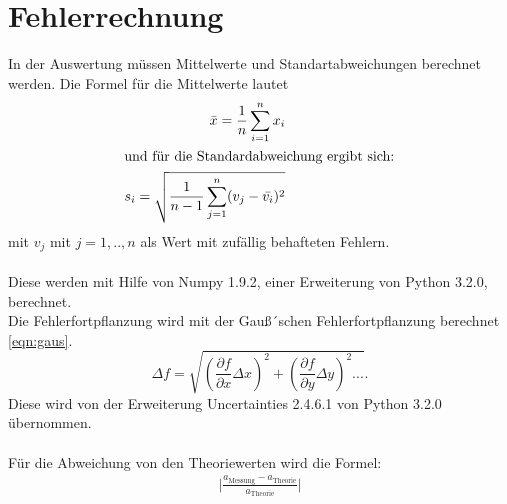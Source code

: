 \newpage
\section{Fehlerrechnung}
\label{fehlerrechnung}
In der Auswertung müssen Mittelwerte und Standartabweichungen berechnet werden.
Die Formel für die Mittelwerte lautet
\begin{align}
  \bar{x}=\frac{1}{n} \sum_{i=1}^n x_i\\
\intertext{und für die Standardabweichung ergibt sich:}
s_i=\sqrt{\frac{1}{n-1}\sum_{j=1}^n (v_j-\bar{v_i})^2}
\end{align}
mit $v_j$ mit $j=1,..,n$ als Wert mit zufällig behafteten Fehlern.\\
\\
Diese werden mit Hilfe von
Numpy 1.9.2, einer Erweiterung von Python 3.2.0, berechnet.
\\
Die Fehlerfortpflanzung wird mit der Gauß´schen Fehlerfortpflanzung berechnet
 \eqref{eqn:gaus}.
\begin{equation}
\Delta f= \sqrt{\left(\frac{\partial f}{\partial x}\Delta x \right)^{2} + \left( \frac{\partial f}{\partial y}\Delta y\right)^2...}\label{eqn:gaus}.
\end{equation}
Diese wird von der Erweiterung Uncertainties 2.4.6.1 von Python 3.2.0 übernommen.\\
\\
Für die Abweichung von den Theoriewerten wird die Formel:
\begin{align}
  \biggl|  \frac{a_\mathrm{Messung}-a_\mathrm{Theorie}}{a_\mathrm{Theorie}}  \biggr|
\end{align}
